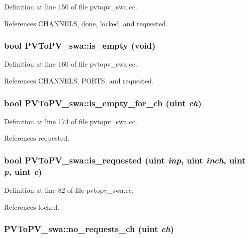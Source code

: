 Definition at line 150 of file pvtopv\_\-swa.cc.

References CHANNELS, done, locked, and requested.
\subsubsection[{is\_\-empty}]{\setlength{\rightskip}{0pt plus 5cm}bool PVToPV\_\-swa::is\_\-empty (void)}\label{classPVToPV__swa_2c5f9c5a78aa05ab166b58d04738081d}




Definition at line 160 of file pvtopv\_\-swa.cc.

References CHANNELS, PORTS, and requested.
\subsubsection[{is\_\-empty\_\-for\_\-ch}]{\setlength{\rightskip}{0pt plus 5cm}bool PVToPV\_\-swa::is\_\-empty\_\-for\_\-ch ({\bf uint} {\em ch})}\label{classPVToPV__swa_131c0ee2c54b76f6c10858889104edb4}




Definition at line 174 of file pvtopv\_\-swa.cc.

References requested.
\subsubsection[{is\_\-requested}]{\setlength{\rightskip}{0pt plus 5cm}bool PVToPV\_\-swa::is\_\-requested ({\bf uint} {\em inp}, \/  {\bf uint} {\em inch}, \/  {\bf uint} {\em p}, \/  {\bf uint} {\em c})}\label{classPVToPV__swa_bc1410b2178d02ce2bacba66707e1b1e}




Definition at line 82 of file pvtopv\_\-swa.cc.

References locked.
\subsubsection[{no\_\-requests\_\-ch}]{ PVToPV\_\-swa::no\_\-requests\_\-ch ({\bf uint} {\em ch})}\label{classPVToPV__swa_31bf97288ff71191f3fc7210d29976a9}





